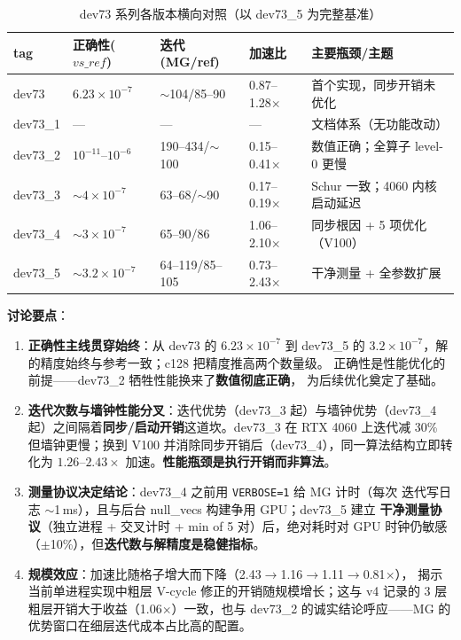 \documentclass[11pt,a4paper]{article}
\begin{document}
\begin{table}[H]
\centering
\small
\begin{tabular}{p{1.5cm}p{1.6cm}p{3.2cm}p{2.4cm}p{5cm}}
\toprule
tag & 正确性($vs\_ref$) & 迭代(MG/ref) & 加速比 & 主要瓶颈/主题 \\
\midrule
dev73   & $6.23\times10^{-7}$ & $\sim$104/85--90 & 0.87--1.28$\times$ & 首个实现，同步开销未优化 \\
dev73\_1 & — & — & — & 文档体系（无功能改动） \\
dev73\_2 & $10^{-11}$--$10^{-6}$ & 190--434/$\sim$100 & 0.15--0.41$\times$ & 数值正确；全算子 level-0 更慢 \\
dev73\_3 & $\sim$$4\times10^{-7}$ & 63--68/$\sim$90 & 0.17--0.19$\times$ & Schur 一致；4060 内核启动延迟 \\
dev73\_4 & $\sim$$3\times10^{-7}$ & 65--90/86 & 1.06--2.10$\times$ & 同步根因 + 5 项优化（V100） \\
dev73\_5 & $\sim$$3.2\times10^{-7}$ & 64--119/85--105 & 0.73--2.43$\times$ & 干净测量 + 全参数扩展 \\
\bottomrule
\end{tabular}
\caption{dev73 系列各版本横向对照（以 dev73\_5 为完整基准）}
\end{table}

\textbf{讨论要点}：
\begin{enumerate}
  \item \textbf{正确性主线贯穿始终}：从 dev73 的 $6.23\times10^{-7}$ 到 dev73\_5 的
        $3.2\times10^{-7}$，解的精度始终与参考一致；c128 把精度推高两个数量级。
        正确性是性能优化的前提——dev73\_2 牺牲性能换来了\textbf{数值彻底正确}，
        为后续优化奠定了基础。
  \item \textbf{迭代次数与墙钟性能分叉}：迭代优势（dev73\_3 起）与墙钟优势（dev73\_4
        起）之间隔着\textbf{同步/启动开销}这道坎。dev73\_3 在 RTX 4060 上迭代减 30\%
        但墙钟更慢；换到 V100 并消除同步开销后（dev73\_4），同一算法结构立即转化为
        $1.26$--$2.43\times$ 加速。\textbf{性能瓶颈是执行开销而非算法}。
  \item \textbf{测量协议决定结论}：dev73\_4 之前用 \texttt{VERBOSE=1} 给 MG 计时（每次
        迭代写日志 $\sim$1\,ms），且与后台 null\_vecs 构建争用 GPU；dev73\_5 建立
        \textbf{干净测量协议}（独立进程 + 交叉计时 + min of 5 对）后，绝对耗时对 GPU
        时钟仍敏感（$\pm$10\%），但\textbf{迭代数与解精度是稳健指标}。
  \item \textbf{规模效应}：加速比随格子增大而下降（2.43$\to$1.16$\to$1.11$\to$0.81$\times$），
        揭示当前单进程实现中粗层 V-cycle 修正的开销随规模增长；这与 v4 记录的 3 层
        粗层开销大于收益（1.06$\times$）一致，也与 dev73\_2 的诚实结论呼应——MG 的
        优势窗口在细层迭代成本占比高的配置。
\end{enumerate}
\end{document}

